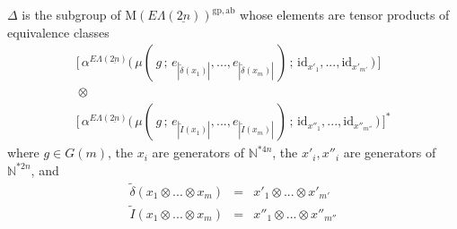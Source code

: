 \documentclass{amsbook} %
\newcommand{\ELnn}{E\Lambda(\underline{2n})}
\numberwithin{section}{chapter}
\begin{document}
\begin{lem} $\Delta$ is the subgroup of $\mathrm{M}(\ELnn)^{\mathrm{gp, ab}}$ whose elements are tensor products of equivalence classes
\[ \begin{array}{c}
			\big[ \, \alpha^{\ELnn}\big( \, \mu( \, g \, ; \, e_{|\tilde{\delta}(x_1)|}, ..., e_{|\tilde{\delta}(x_m)|} \, ) \, ; \, \mathrm{id}_{x'_1}, ...,  \mathrm{id}_{x'_{m'}} \, \big) \, \big] \\
			\, \otimes \, \\
			\big[ \, \alpha^{\ELnn}\big( \, \mu( \, g \, ; \, e_{|\tilde{I}(x_1)|}, ..., e_{|\tilde{I}(x_m)|} \, ) \, ; \, \mathrm{id}_{x''_1}, ...,  \mathrm{id}_{x''_{m''}} \, \big) \, \big]^*
		\end{array}
\] 
where $g \in G(m)$, the $x_i$ are generators of $\mathbb{N}^{\ast 4n}$, the $x'_i, x''_i$ are generators of $\mathbb{N}^{\ast 2n}$, and
\[ \begin{array}{rll}
			\tilde{\delta}( x_1 \otimes ... \otimes x_m) & = & x'_1 \otimes ... \otimes x'_{m'} \\
			\tilde{I}( x_1 \otimes ... \otimes x_m) & = & x''_1 \otimes ... \otimes x''_{m''}
		\end{array}
\]
\end{lem}
\end{document}
